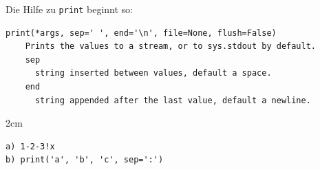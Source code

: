 \question[3]
Die Hilfe zu \texttt{print} beginnt so:
\begin{lstlisting}[language={}]
print(*args, sep=' ', end='\n', file=None, flush=False)
    Prints the values to a stream, or to sys.stdout by default.
    sep
      string inserted between values, default a space.
    end
      string appended after the last value, default a newline.
\end{lstlisting}
\begin{solutionbox}{2cm}
\begin{lstlisting}[language={}]
a) 1-2-3!x
b) print('a', 'b', 'c', sep=':')
\end{lstlisting}
\end{solutionbox}
